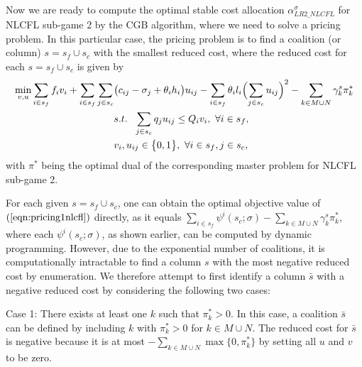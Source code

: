 \documentclass[ijoc,nonblindrev]{informs3} %
\begin{document}
Now we are ready to compute the optimal stable cost allocation $\alpha_{LR2\_NLCFL}^{\sigma}$ for NLCFL sub-game 2 by  the CGB algorithm, where we need to solve a pricing problem. In this particular case, the pricing problem is to find a coalition (or column) $s=s_f \cup s_c$ with the smallest reduced cost, where the reduced  cost for each $s = s_f \cup s_c$ is given by
\begin{eqnarray}\label{eqn:pricing1nlcfl}
\begin{aligned}
\begin{split}
\min_{v,u}  \sum_{i \in s_f} f_i v_i + \sum_{i \in s_f}\sum_{j \in s_c} &\big(c_{ij} - \sigma_j + \theta_ih_i\big)u_{ij} - \sum_{i \in s_f} \theta_il_i \Bigl( \sum_{j \in s_c}u_{ij}\Bigr)^2 - \sum_{k \in M \cup N} \gamma^s_k \pi_k^*\\
&s.t. ~~\sum_{j \in s_c}q_ju_{ij} \leq Q_iv_i, ~\forall i \in s_f,\\
&v_i, u_{ij} \in \big\{0,1\big\},~\forall i \in s_f, j \in s_c,
\end{split}
\end{aligned}
\end{eqnarray}
with $\pi^*$ being the optimal dual of the corresponding master problem for NLCFL sub-game 2.


For each given $s=s_f\cup s_c$, one can obtain the optimal objective value of $(\ref{eqn:pricing1nlcfl})$ directly, as it equals $\sum_{i\in s_f}\psi^{i}(s_c;\sigma)-\sum_{k \in M \cup N} \gamma^s_k \pi_k^*$, where each $\psi^{i}(s_c;\sigma)$, as shown earlier, can be computed by dynamic programming. However, due to the exponential number of coalitions, it is computationally intractable to find a column $s$ with the most negative reduced cost by enumeration. We therefore attempt to first identify a column $\bar{s}$ with a negative reduced cost by considering the following two cases:

Case 1: There exists at least one $k$ such that $\pi^*_k>0$. In this case, a coalition $\bar s$ can be defined by including $k$ with $\pi^*_k>0$ for $k\in M \cup N$. The reduced cost for $\bar s$ is negative because it is at most $-\sum_{k\in M\cup N} \max\{0, \pi^*_k\}$ by setting all $u$ and $v$ to be zero.
\end{document}
